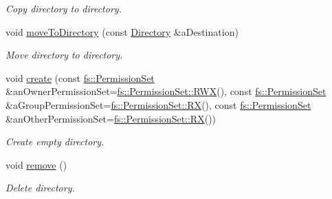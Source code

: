 \begin{DoxyCompactItemize}
\begin{DoxyCompactList}\small\item\em Copy directory to directory. \end{DoxyCompactList}\item 
void \hyperlink{classlibrary_1_1core_1_1fs_1_1_directory_a666a1ac6f84535bb113979115a760f11}{move\+To\+Directory} (const \hyperlink{classlibrary_1_1core_1_1fs_1_1_directory}{Directory} \&a\+Destination)
\begin{DoxyCompactList}\small\item\em Move directory to directory. \end{DoxyCompactList}\item 
void \hyperlink{classlibrary_1_1core_1_1fs_1_1_directory_ad1f35a8538aaccff2a64e024f3a68ddb}{create} (const \hyperlink{classlibrary_1_1core_1_1fs_1_1_permission_set}{fs\+::\+Permission\+Set} \&an\+Owner\+Permission\+Set=\hyperlink{classlibrary_1_1core_1_1fs_1_1_permission_set_aa193bcbecb0c6ebbb488e99052cbba88}{fs\+::\+Permission\+Set\+::\+R\+WX}(), const \hyperlink{classlibrary_1_1core_1_1fs_1_1_permission_set}{fs\+::\+Permission\+Set} \&a\+Group\+Permission\+Set=\hyperlink{classlibrary_1_1core_1_1fs_1_1_permission_set_adb5417e6188ca697a21723613a60b690}{fs\+::\+Permission\+Set\+::\+RX}(), const \hyperlink{classlibrary_1_1core_1_1fs_1_1_permission_set}{fs\+::\+Permission\+Set} \&an\+Other\+Permission\+Set=\hyperlink{classlibrary_1_1core_1_1fs_1_1_permission_set_adb5417e6188ca697a21723613a60b690}{fs\+::\+Permission\+Set\+::\+RX}())
\begin{DoxyCompactList}\small\item\em Create empty directory. \end{DoxyCompactList}\item 
void \hyperlink{classlibrary_1_1core_1_1fs_1_1_directory_a8392a637e3b8cc07f55c0bc2850fb42b}{remove} ()
\begin{DoxyCompactList}\small\item\em Delete directory. \end{DoxyCompactList}\end{DoxyCompactItemize}

